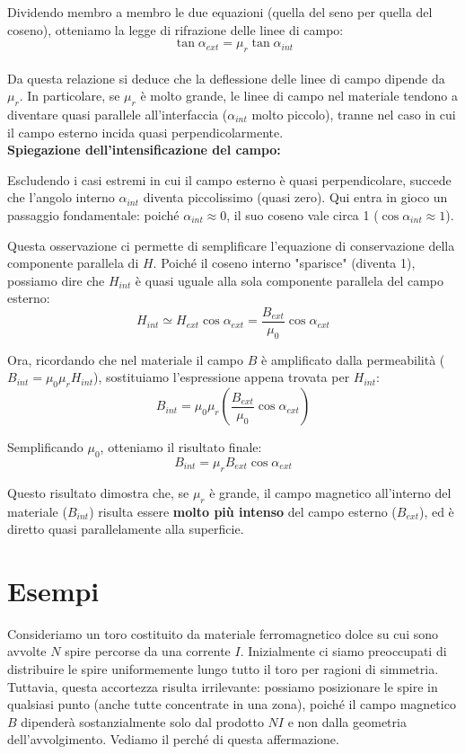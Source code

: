 \documentclass{book}
\begin{document}
Dividendo membro a membro le due equazioni (quella del seno per quella del coseno), otteniamo la legge di rifrazione delle linee di campo:
$$
\tan{\alpha_{ext}} = \mu_r \tan{\alpha_{int}}
$$
\\
Da questa relazione si deduce che la deflessione delle linee di campo dipende da $\mu_r$. In particolare, se $\mu_r$ è molto grande, le linee di campo nel materiale tendono a diventare quasi parallele all'interfaccia ($\alpha_{int}$ molto piccolo), tranne nel caso in cui il campo esterno incida quasi perpendicolarmente.
\\
\textbf{Spiegazione dell'intensificazione del campo:}

Escludendo i casi estremi in cui il campo esterno è quasi perpendicolare, succede che l'angolo interno $\alpha_{int}$ diventa piccolissimo (quasi zero).
Qui entra in gioco un passaggio fondamentale: poiché $\alpha_{int} \approx 0$, il suo coseno vale circa 1 ($ \cos\alpha_{int} \approx 1 $).

Questa osservazione ci permette di semplificare l'equazione di conservazione della componente parallela di $H$. Poiché il coseno interno "sparisce" (diventa 1), possiamo dire che $H_{int}$ è quasi uguale alla sola componente parallela del campo esterno:
$$
H_{int} \simeq H_{ext}\cos\alpha_{ext} = \frac{B_{ext}}{\mu_0} \cos\alpha_{ext}
$$

Ora, ricordando che nel materiale il campo $B$ è amplificato dalla permeabilità ($B_{int} = \mu_0 \mu_r H_{int}$), sostituiamo l'espressione appena trovata per $H_{int}$:
$$
B_{int} = \mu_0 \mu_r \left( \frac{B_{ext}}{\mu_0} \cos\alpha_{ext} \right)
$$

Semplificando $\mu_0$, otteniamo il risultato finale:
$$
B_{int} = \mu_r B_{ext} \cos\alpha_{ext}
$$

Questo risultato dimostra che, se $\mu_r$ è grande, il campo magnetico all'interno del materiale ($B_{int}$) risulta essere \textbf{molto più intenso} del campo esterno ($B_{ext}$), ed è diretto quasi parallelamente alla superficie.
 

\section{Esempi}

Consideriamo un toro costituito da materiale ferromagnetico dolce su cui sono avvolte $N$ spire percorse da una corrente $I$.
Inizialmente ci siamo preoccupati di distribuire le spire uniformemente lungo tutto il toro per ragioni di simmetria. Tuttavia, questa accortezza risulta irrilevante: possiamo posizionare le spire in qualsiasi punto (anche tutte concentrate in una zona), poiché il campo magnetico $B$ dipenderà sostanzialmente solo dal prodotto $NI$ e non dalla geometria dell'avvolgimento.
Vediamo il perché di questa affermazione.
\end{document}
